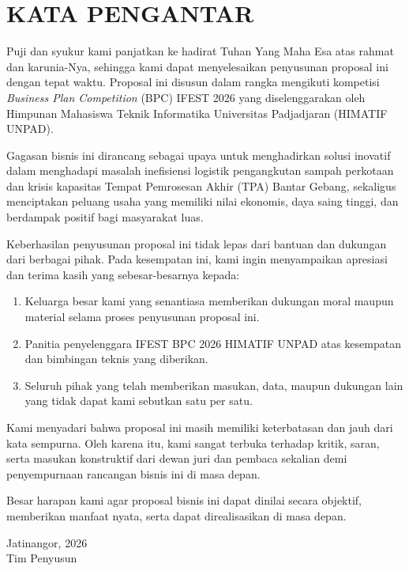 \section*{\centering\fontsize{14}{21}\selectfont\bfseries KATA PENGANTAR}

Puji dan syukur kami panjatkan ke hadirat Tuhan Yang Maha Esa atas rahmat dan karunia-Nya, sehingga kami dapat menyelesaikan penyusunan proposal ini dengan tepat waktu. Proposal ini disusun dalam rangka mengikuti kompetisi \textit{Business Plan Competition} (BPC) IFEST 2026 yang diselenggarakan oleh Himpunan Mahasiswa Teknik Informatika Universitas Padjadjaran (HIMATIF UNPAD).

Gagasan bisnis ini dirancang sebagai upaya untuk menghadirkan solusi inovatif dalam menghadapi masalah inefisiensi logistik pengangkutan sampah perkotaan dan krisis kapasitas Tempat Pemrosesan Akhir (TPA) Bantar Gebang, sekaligus menciptakan peluang usaha yang memiliki nilai ekonomis, daya saing tinggi, dan berdampak positif bagi masyarakat luas.

Keberhasilan penyusunan proposal ini tidak lepas dari bantuan dan dukungan dari berbagai pihak. Pada kesempatan ini, kami ingin menyampaikan apresiasi dan terima kasih yang sebesar-besarnya kepada:
\begin{enumerate}[leftmargin=1.5cm]
  \item Keluarga besar kami yang senantiasa memberikan dukungan moral maupun material selama proses penyusunan proposal ini.  
  \item Panitia penyelenggara IFEST BPC 2026 HIMATIF UNPAD atas kesempatan dan bimbingan teknis yang diberikan.
  \item Seluruh pihak yang telah memberikan masukan, data, maupun dukungan lain yang tidak dapat kami sebutkan satu per satu.
\end{enumerate}

Kami menyadari bahwa proposal ini masih memiliki keterbatasan dan jauh dari kata sempurna. Oleh karena itu, kami sangat terbuka terhadap kritik, saran, serta masukan konstruktif dari dewan juri dan pembaca sekalian demi penyempurnaan rancangan bisnis ini di masa depan.

Besar harapan kami agar proposal bisnis ini dapat dinilai secara objektif, memberikan manfaat nyata, serta dapat direalisasikan di masa depan.

\vspace{1cm}
\begin{flushright}
Jatinangor, 2026\\
Tim Penyusun
\end{flushright}
